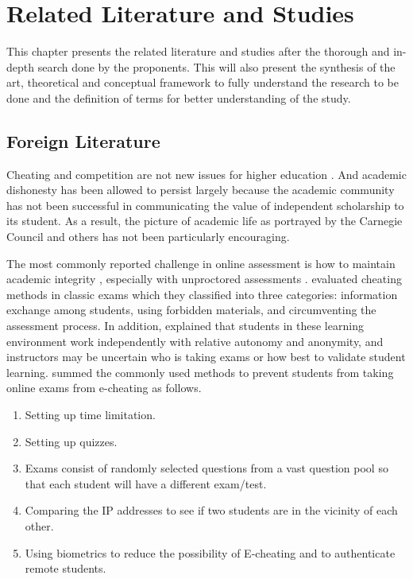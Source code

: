\chapter{Related Literature and Studies}

This chapter presents the related literature and studies after the thorough and in-depth search done by the proponents.
This will also present the synthesis of the art, theoretical and conceptual framework to fully understand the research to be done and the definition of terms for better understanding of the study.

\section{Foreign Literature}

Cheating and competition are not new issues for higher education \cite{nuss1984academic}.
And academic dishonesty has been allowed to persist largely because the academic community has not been successful in communicating the value of independent scholarship to its student.
As a result, the picture of academic life as portrayed by the Carnegie Council and others has not been particularly encouraging.

The most commonly reported challenge in online assessment is how to maintain academic integrity \cite{hollister2009proctored}, especially with unproctored assessments \cite{arnold2016cheating}.
 evaluated cheating methods in classic exams which they classified into three categories: information exchange among students, using forbidden materials, and circumventing the assessment process.
In addition,  explained that students in these learning environment work independently with relative autonomy and anonymity, and instructors may be uncertain who is taking exams or how best to validate student learning.
 summed the commonly used methods to prevent students from taking online exams from e-cheating as follows.

\begin{enumerate}
   \item Setting up time limitation.
   \item Setting up quizzes.
   \item Exams consist of randomly selected questions from a vast question pool so that each student will have a different exam/test.
   \item Comparing the IP addresses to see if two students are in the vicinity of each other.
   \item Using biometrics to reduce the possibility of E-cheating and to authenticate remote students.
\end{enumerate}

